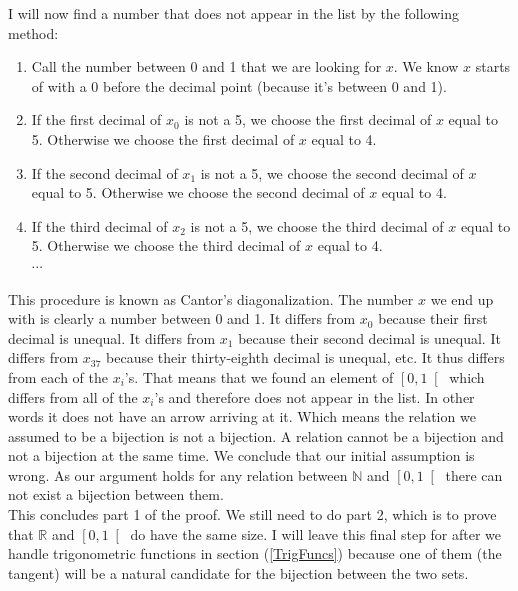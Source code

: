 \noindent I will now find a number that does not appear in the list by the following method:
\begin{enumerate}
\item Call the number between 0 and 1 that we are looking for $x$. We know $x$ starts of with a $0$ before the decimal point (because it's between 0 and 1). 
\item If the first decimal of $x_0$ is not a 5, we choose the first decimal of $x$ equal to 5. Otherwise we choose the first decimal of $x$ equal to 4.
\item  If the second decimal of $x_1$ is not a 5, we choose the second decimal of $x$ equal to 5. Otherwise we choose the second decimal of $x$ equal to 4.
\item If the third decimal of $x_2$ is not a 5, we choose the third decimal of $x$ equal to 5. Otherwise we choose the third decimal of $x$ equal to 4.\\
$\cdots$
\end{enumerate}
\noindent This procedure is known as Cantor's diagonalization. The number $x$ we end up with is clearly a number between 0 and 1. It differs from $x_0$ because their first decimal is unequal. It differs from $x_1$ because their second decimal is unequal. It differs from $x_{37}$ because their thirty-eighth decimal is unequal, etc. It thus differs from each of the $x_i$'s. That means that we found an element of $\left[ 0 , 1 \right[$ which differs from all of the $x_i$'s and therefore does not appear in the list. In other words it does not have an arrow arriving at it. Which means the relation we assumed to be a bijection is not a bijection. A relation cannot be a bijection and not a bijection at the same time. We conclude that our initial assumption is wrong. As our argument holds for any relation between $\mathbb{N}$ and $\left[ 0,1 \right[$ there can not exist a bijection between them.\\

\noindent This concludes part 1 of the proof. We still need to do part 2, which is to prove that $\mathbb{R}$ and $\left[ 0,1 \right[$ do have the same size. I will leave this final step for after we handle trigonometric functions in section (\ref{TrigFuncs}) because one of them (the tangent) will be a natural candidate for the bijection between the two sets.

